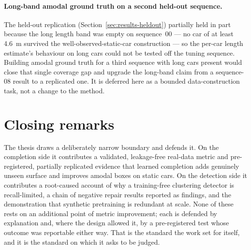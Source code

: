 \paragraph{Long-band amodal ground truth on a second held-out sequence.} The held-out
replication (Section~\ref{sec:results-heldout}) partially held in part because the long length band was empty on
sequence~00 --- no car of at least \SI{4.6}{\metre} survived the well-observed-static-car
construction --- so the per-car length estimate's behaviour on long cars could not be tested
off the tuning sequence. Building amodal ground truth for a third sequence with long cars
present would close that single coverage gap and upgrade the long-band claim from a
sequence-08 result to a replicated one. It is deferred here as a bounded data-construction
task, not a change to the method.

\section{Closing remarks}
\label{sec:conclusion-closing}

The thesis draws a deliberately narrow boundary and defends it. On the completion side it
contributes a validated, leakage-free real-data metric and pre-registered, partially
replicated evidence that learned completion adds genuinely unseen surface and improves
amodal boxes on static cars. On the detection side it contributes a root-caused account of
why a training-free clustering detector is recall-limited, a chain of negative repair
results reported as findings, and the demonstration that synthetic pretraining is redundant
at scale. None of these rests on an additional point of metric improvement; each is defended
by explanation and, where the design allowed it, by a pre-registered test whose outcome was
reportable either way. That is the standard the work set for itself, and it is the standard
on which it asks to be judged.
